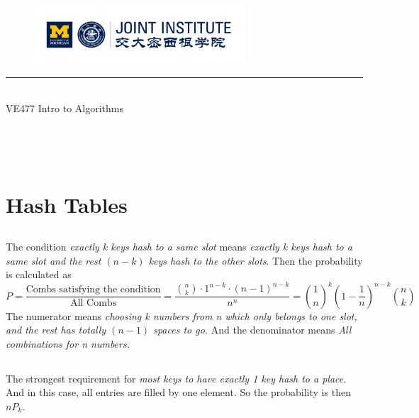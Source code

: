 \documentclass{article}
\begin{document}
\setmainfont{Cormorant Upright}
\renewcommand\arraystretch{1.5}


\thispagestyle{empty}

\begin{center}
\begin{large}
\begin{figure}[!htbp]
\centering
\includegraphics[width=0.7\textwidth]{Logo2.png}
\end{figure}
\hrule
\vspace*{0.25cm}
 \\ 
VE477 Intro to Algorithms\\
\end{large}
\hrulefill

\vspace*{3cm}

\begin{Large}
 \\
\end{Large}
\vspace*{2cm}
\begin{large}
 \\
\end{large}
\end{center}
\newpage
\setmainfont{Optima}
\setmonofont{Optima}
\setsansfont{Optima}
\setcounter{page}{1}
\section{Hash Tables}
\subsection{}
The condition \textit{exactly k keys hash to a same slot} means \textit{exactly k keys hash to a same slot and the rest $(n-k)$ keys hash to the other slots}.
Then the probability is calculated as \[
	P = \frac{\text{Combs satisfying the condition}}{\text{All Combs}} = \frac{\binom{n}{k}\cdot 1^{n-k	}\cdot (n-1)^{n-k}}{n^n} = \binom{1}{n}^k \left(1- \frac{1}{n} \right)^{n-k} \binom{n}{k}
\]	
The numerator means \textit{choosing k numbers from n which only belongs to one slot, and the rest has totally $(n-1)$ spaces to go.} And the denominator means \textit{All combinations for n numbers.}
\subsection{}
The strongest requirement for \textit{most keys to have exactly 1 key hash to a place.} And in this case, all entries are filled by one element. So the probability is then $nP_k$.
\subsection{}
\end{document}
